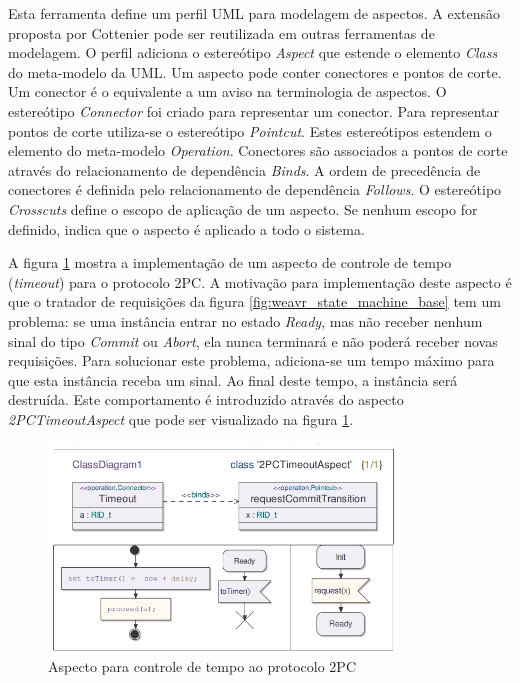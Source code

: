 Esta ferramenta define um perfil UML para modelagem de aspectos. A extensão proposta por Cottenier pode ser reutilizada em outras
ferramentas de modelagem. O perfil adiciona o estereótipo \textit{Aspect} que estende o elemento \textit{Class} do meta-modelo da UML. Um aspecto pode 
conter conectores e pontos de corte. Um conector é o equivalente a um aviso na terminologia de aspectos. O estereótipo
\textit{Connector} foi criado para representar um conector. Para representar pontos de corte utiliza-se o estereótipo \textit{Pointcut}. Estes
estereótipos estendem o elemento do meta-modelo \textit{Operation}. Conectores são associados a pontos de corte através do relacionamento de
dependência \textit{Binds}. A ordem de precedência de conectores é definida pelo relacionamento de dependência \textit{Follows}. O estereótipo
\textit{Crosscuts} define o escopo de aplicação de um aspecto. Se nenhum escopo for definido, indica que o aspecto é aplicado a todo o sistema.

A figura \ref{fig:weavr_timeout} mostra a implementação de um aspecto de controle de tempo (\textit{timeout}) para o protocolo 2PC. A motivação para
implementação deste aspecto é que o tratador de requisições da figura \ref{fig:weavr_state_machine_base} tem um problema: se uma instância entrar no
estado \textit{Ready}, mas não receber nenhum sinal do tipo \textit{Commit} ou \textit{Abort}, ela nunca terminará e não poderá receber
novas requisições. Para solucionar este problema, adiciona-se um tempo máximo para que esta instância receba um sinal. Ao final deste tempo, a
instância será destruída. Este comportamento é introduzido através do aspecto \textit{2PCTimeoutAspect} que pode ser visualizado na figura
\ref{fig:weavr_timeout}. 

\begin{figure}
	\centering
	\includegraphics[width=350px]{img/weavr_timeout.png}
	\caption{Aspecto para controle de tempo ao protocolo 2PC}\label{fig:weavr_timeout}
\end{figure}

